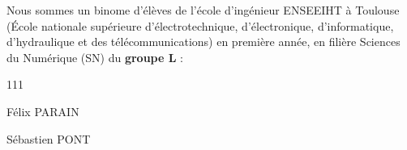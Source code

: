 Nous sommes un binome d'élèves de l'école d'ingénieur ENSEEIHT à Toulouse
(École nationale supérieure d'électrotechnique, d'électronique, d'informatique, d'hydraulique
et des télécommunications) en première année, en filière Sciences du Numérique (SN) du \textbf{groupe L} :\\
\begin{dinglist}{111}
   \item Félix PARAIN
   \item Sébastien PONT
\end{dinglist}
